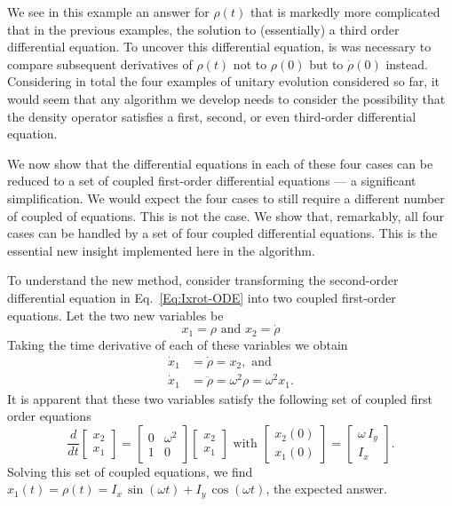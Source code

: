 We see in this example an answer for $\rho(t)$ that is markedly more complicated that in the previous examples, the solution to (essentially) a third order differential equation.  To uncover this differential equation, is was necessary to compare subsequent derivatives of $\rho(t)$ not to $\rho(0)$ but to $\dot{\rho}(0)$ instead.  Considering in total the four examples of unitary evolution considered so far, it would seem that any algorithm we develop needs to consider the possibility that the density operator satisfies a first, second, or even third-order differential equation. 

 We now show that the differential equations in each of these four cases can be reduced to a set of coupled first-order differential equations --- a significant simplification.  We would expect the four cases to still require a different number of coupled of equations. This is not the case.  We show that, remarkably, all four cases can be handled by a set of four coupled differential equations.  This is the essential new insight implemented here in the  algorithm. 

To understand the new method, consider transforming the second-order differential equation in Eq.~\ref{Eq:Ixrot-ODE} into two coupled first-order equations.  Let the two new variables be 
\begin{equation}
x_1 = \rho \text{ and } x_2 = \dot{\rho}
\end{equation}
Taking the time derivative of each of these variables we obtain 
\begin{subequations}
\begin{align}
\dot{x}_1 & = \dot{\rho} = x_2, \text{ and} \\
\dot{x}_1 & = \ddot{\rho} = \omega^2 \rho = \omega^2 x_1.
\end{align}
\end{subequations}
It is apparent that these two variables satisfy the following set of coupled first order equations
\begin{equation}
\frac{d}{dt} \begin{bmatrix} x_2 \\ x_1 \end{bmatrix}
	= \begin{bmatrix} 0 & \omega^2 \\ 1 & 0 \end{bmatrix}
	  \begin{bmatrix} x_2 \\ x_1 \end{bmatrix}
\text{ with } 
\begin{bmatrix} x_2(0) \\ x_1(0) \end{bmatrix}
	=
	\begin{bmatrix} \omega \, I_{y} \\ I_{x} \end{bmatrix}. \label{Eq:Ixrot-2x2}
\end{equation}
Solving this set of coupled equations, we find $x_1(t) = \rho(t) = I_x \, \sin{(\omega t)} + I_y \, \cos{(\omega t)}$, the expected answer.  

